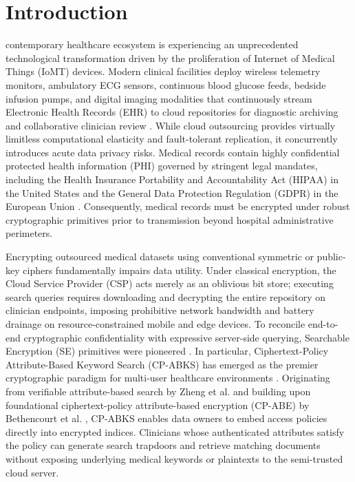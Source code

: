 \documentclass[journal,10pt,twocolumn]{IEEEtran}
\begin{document}
\section{Introduction}

 contemporary healthcare ecosystem is experiencing an unprecedented technological transformation driven by the proliferation of Internet of Medical Things (IoMT) devices. Modern clinical facilities deploy wireless telemetry monitors, ambulatory ECG sensors, continuous blood glucose feeds, bedside infusion pumps, and digital imaging modalities that continuously stream Electronic Health Records (EHR) to cloud repositories for diagnostic archiving and collaborative clinician review \cite{cheng2026bamks, dhinakaran2025safeguarding, gupta2023security}. While cloud outsourcing provides virtually limitless computational elasticity and fault-tolerant replication, it concurrently introduces acute data privacy risks. Medical records contain highly confidential protected health information (PHI) governed by stringent legal mandates, including the Health Insurance Portability and Accountability Act (HIPAA) in the United States and the General Data Protection Regulation (GDPR) in the European Union \cite{cheng2026bamks}. Consequently, medical records must be encrypted under robust cryptographic primitives prior to transmission beyond hospital administrative perimeters.

Encrypting outsourced medical datasets using conventional symmetric or public-key ciphers fundamentally impairs data utility. Under classical encryption, the Cloud Service Provider (CSP) acts merely as an oblivious bit store; executing search queries requires downloading and decrypting the entire repository on clinician endpoints, imposing prohibitive network bandwidth and battery drainage on resource-constrained mobile and edge devices. To reconcile end-to-end cryptographic confidentiality with expressive server-side querying, Searchable Encryption (SE) primitives were pioneered \cite{song2000practical, boneh2004peks}. In particular, Ciphertext-Policy Attribute-Based Keyword Search (CP-ABKS) has emerged as the premier cryptographic paradigm for multi-user healthcare environments \cite{bethencourt2007cpabe, waters2011expressive}. Originating from verifiable attribute-based search by Zheng et al. \cite{zheng2014vabks} and building upon foundational ciphertext-policy attribute-based encryption (CP-ABE) by Bethencourt et al. \cite{bethencourt2007cpabe}, CP-ABKS enables data owners to embed access policies directly into encrypted indices. Clinicians whose authenticated attributes satisfy the policy can generate search trapdoors and retrieve matching documents without exposing underlying medical keywords or plaintexts to the semi-trusted cloud server.
\end{document}
